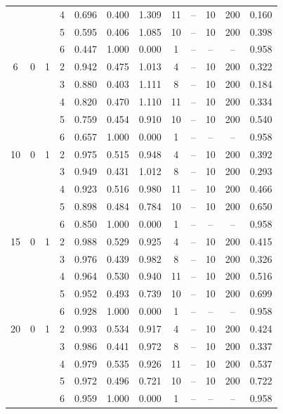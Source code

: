 \documentclass[12pt]{article}
\begin{document}
\begin{table}
\begin{ruledtabular}
\begin{tabular}{cccccccccccc}
 & &  & 4 & 0.696 & 0.400 & 1.309 & 11 & -- & 10 & 200 & 0.160 \\
 & &  & 5 & 0.595 & 0.406 & 1.085 & 10 & -- & 10 & 200 & 0.398 \\
 & &  & 6 & 0.447 & 1.000 & 0.000 & 1 & -- & -- & -- & 0.958 \\
\hline
6 & 0 & 1 & 2 & 0.942 & 0.475 & 1.013 & 4 & -- & 10 & 200 & 0.322 \\
 & &  & 3 & 0.880 & 0.403 & 1.111 & 8 & -- & 10 & 200 & 0.184 \\
 & &  & 4 & 0.820 & 0.470 & 1.110 & 11 & -- & 10 & 200 & 0.334 \\
 & &  & 5 & 0.759 & 0.454 & 0.910 & 10 & -- & 10 & 200 & 0.540 \\
 & &  & 6 & 0.657 & 1.000 & 0.000 & 1 & -- & -- & -- & 0.958 \\
\hline
10 & 0 & 1 & 2 & 0.975 & 0.515 & 0.948 & 4 & -- & 10 & 200 & 0.392 \\
 & &  & 3 & 0.949 & 0.431 & 1.012 & 8 & -- & 10 & 200 & 0.293 \\
 & &  & 4 & 0.923 & 0.516 & 0.980 & 11 & -- & 10 & 200 & 0.466 \\
 & &  & 5 & 0.898 & 0.484 & 0.784 & 10 & -- & 10 & 200 & 0.650 \\
 & &  & 6 & 0.850 & 1.000 & 0.000 & 1 & -- & -- & -- & 0.958 \\
\hline
15 & 0 & 1 & 2 & 0.988 & 0.529 & 0.925 & 4 & -- & 10 & 200 & 0.415 \\
 & &  & 3 & 0.976 & 0.439 & 0.982 & 8 & -- & 10 & 200 & 0.326 \\
 & &  & 4 & 0.964 & 0.530 & 0.940 & 11 & -- & 10 & 200 & 0.516 \\
 & &  & 5 & 0.952 & 0.493 & 0.739 & 10 & -- & 10 & 200 & 0.699 \\
 & &  & 6 & 0.928 & 1.000 & 0.000 & 1 & -- & -- & -- & 0.958 \\
\hline
20 & 0 & 1 & 2 & 0.993 & 0.534 & 0.917 & 4 & -- & 10 & 200 & 0.424 \\
 & &  & 3 & 0.986 & 0.441 & 0.972 & 8 & -- & 10 & 200 & 0.337 \\
 & &  & 4 & 0.979 & 0.535 & 0.926 & 11 & -- & 10 & 200 & 0.537 \\
 & &  & 5 & 0.972 & 0.496 & 0.721 & 10 & -- & 10 & 200 & 0.722 \\
 & &  & 6 & 0.959 & 1.000 & 0.000 & 1 & -- & -- & -- & 0.958
\end{tabular}
\end{ruledtabular}
\end{table}
\end{document}
